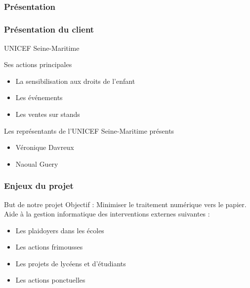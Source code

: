 \subsection{} %

\speaker{\Pierre}
\begin{frame}
\frametitle{Présentation}
	\frametitle{Présentation du client}
	\begin{center}
		UNICEF Seine-Maritime
	\end{center}

	\begin{block}{Ses actions principales}
		\begin{itemize}
			\item La sensibilisation aux droits de l'enfant
			\item Les événements 
			\item Les ventes sur stands
		\end{itemize}
	\end{block}

	\begin{block}{Les représentants de l'UNICEF Seine-Maritime présents}
		\begin{itemize}
			\item Véronique Davreux
			\item Naoual Guery
		\end{itemize}
	\end{block}
\end{frame}

\speaker{\Kafui}
\begin{frame}
\frametitle{Enjeux du projet}
	\begin{block}{But de notre projet}
		Objectif : Minimiser le traitement numérique vers le papier. \\
		Aide à la gestion informatique des interventions externes suivantes :
		\begin{itemize}
			\item Les plaidoyers dans les \'ecoles
			\item Les actions frimousses
			\item Les projets de lycéens et d'étudiants
			\item Les actions ponctuelles
		\end{itemize}
	\end{block}
\end{frame}
